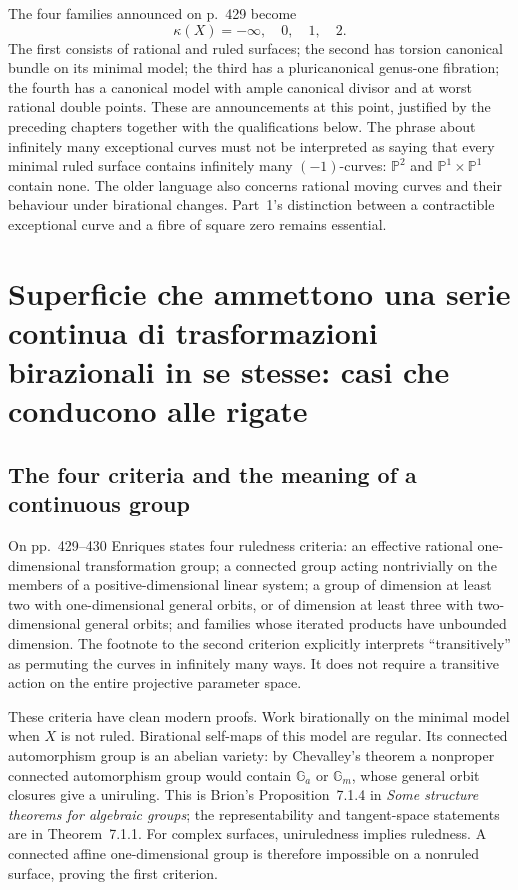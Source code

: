 The four families announced on p.~429 become
\[
\kappa(X)=-\infty,\quad0,\quad1,\quad2.
\]
The first consists of rational and ruled surfaces; the second has torsion canonical bundle on its minimal model; the third has a pluricanonical genus-one fibration; the fourth has a canonical model with ample canonical divisor and at worst rational double points. These are announcements at this point, justified by the preceding chapters together with the qualifications below. The phrase about infinitely many exceptional curves must not be interpreted as saying that every minimal ruled surface contains infinitely many \((-1)\)-curves: \(\mathbb P^2\) and \(\mathbb P^1\times\mathbb P^1\) contain none. The older language also concerns rational moving curves and their behaviour under birational changes. Part~1's distinction between a contractible exceptional curve and a fibre of square zero remains essential.

\section[Trasformazioni e rigate]{Superficie che ammettono una serie continua di trasformazioni birazionali in se stesse: casi che conducono alle rigate}
\label{cp2-xi-2}

\subsection{The four criteria and the meaning of a continuous group}

On pp.~429--430 Enriques states four ruledness criteria: an effective rational one-dimensional transformation group; a connected group acting nontrivially on the members of a positive-dimensional linear system; a group of dimension at least two with one-dimensional general orbits, or of dimension at least three with two-dimensional general orbits; and families whose iterated products have unbounded dimension. The footnote to the second criterion explicitly interprets ``transitively'' as permuting the curves in infinitely many ways. It does not require a transitive action on the entire projective parameter space.

These criteria have clean modern proofs. Work birationally on the minimal model when \(X\) is not ruled. Birational self-maps of this model are regular. Its connected automorphism group is an abelian variety: by Chevalley's theorem a nonproper connected automorphism group would contain \(\mathbb G_a\) or \(\mathbb G_m\), whose general orbit closures give a uniruling. This is Brion's Proposition~7.1.4 in \emph{Some structure theorems for algebraic groups}; the representability and tangent-space statements are in Theorem~7.1.1. For complex surfaces, uniruledness implies ruledness. A connected affine one-dimensional group is therefore impossible on a nonruled surface, proving the first criterion.

